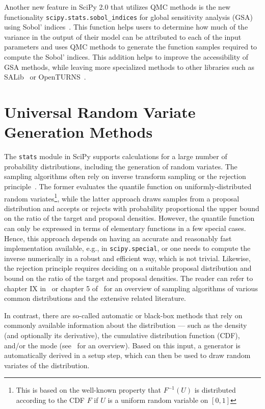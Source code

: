 \documentclass[acmsmall]{acmart}
\begin{document}
Another new feature in SciPy 2.0 that utilizes QMC methods is the new functionality
\texttt{scipy.stats.sobol\_indices} for global sensitivity analysis (GSA) using Sobol'
indices~\cite{Sobol1993,Sobol2001}. This function helps users to determine how much
of the variance in the output of their model can be attributed to each of the input
parameters and uses QMC methods to generate the function samples required to compute the
Sobol' indices. This addition helps to improve the accessibility of GSA methods, while
leaving more specialized methods to other libraries such as SALib~\cite{Herman2017}
or OpenTURNS~\cite{Baudin2015,Baudin2026}.

\section{Universal Random Variate Generation Methods}\label{sec:sampling}

The \texttt{stats} module in SciPy supports calculations for a large number of
probability distributions, including the generation of random variates.
The sampling algorithms often rely on inverse transform sampling
or the rejection principle~\cite{vonneumann1951,Forsythe1972}. The former evaluates the quantile
function on uniformly-distributed random variates\footnote{This is based on the well-known
property that $F^{-1}(U)$ is distributed according to the CDF $F$ if $U$ is a uniform
random variable on $[0,1]$}, while the latter approach draws
samples from a proposal distribution and accepts or rejects with probability
proportional the upper bound on the ratio of the target and proposal densities. However, the quantile
function can only be expressed in terms of elementary functions in a few special cases.
Hence, this approach depends on having an accurate and reasonably fast implementation
available, e.g., in \texttt{scipy.special}, or one needs to compute the inverse numerically
in a robust and efficient way, which is not trivial. Likewise, the rejection principle
requires deciding on a suitable proposal distribution
and bound on the ratio of the target and proposal densities. The reader can refer to
chapter IX in~\cite{Devroye1986} or chapter 5 of~\cite{gentle2003} for an overview of
sampling algorithms of various common distributions and the extensive related literature.

In contrast, there are so-called automatic or black-box methods that rely on
commonly available information about the distribution --- such as the density
(and optionally its derivative), the cumulative distribution function (CDF), and/or the
mode (see~\cite{hormann2004} for an overview). Based on this input, a generator is
automatically derived in a setup step, which can then be used to draw random variates
of the distribution.
\end{document}
